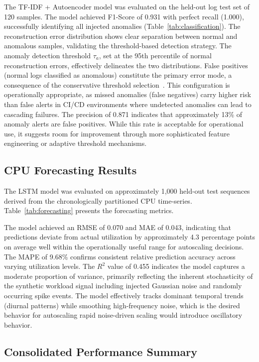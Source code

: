 \documentclass[a4paper,fleqn]{cas-dc}
\begin{document}
The TF-IDF + Autoencoder model was evaluated on the held-out log test set of 120 samples.
The model achieved F1-Score of 0.931 with perfect recall (1.000), successfully identifying all injected anomalies (Table~\ref{tab:classification}).
The reconstruction error distribution shows clear separation between normal and anomalous samples, validating the threshold-based detection strategy.
The anomaly detection threshold $\tau_a$, set at the 95th percentile of normal reconstruction errors, effectively delineates the two distributions.
False positives (normal logs classified as anomalous) constitute the primary error mode, a consequence of the conservative threshold selection~\citep{sakurada2014anomaly}.
This configuration is operationally appropriate, as missed anomalies (false negatives) carry higher risk than false alerts in CI/CD environments where undetected anomalies can lead to cascading failures.
The precision of 0.871 indicates that approximately 13\% of anomaly alerts are false positives.
While this rate is acceptable for operational use, it suggests room for improvement through more sophisticated feature engineering or adaptive threshold mechanisms.

\subsection{CPU Forecasting Results}\label{subsec:cpuresults}

The LSTM model was evaluated on approximately 1,000 held-out test sequences derived from the chronologically partitioned CPU time-series.
Table~\ref{tab:forecasting} presents the forecasting metrics.

The model achieved an RMSE of 0.070 and MAE of 0.043, indicating that predictions deviate from actual utilization by approximately 4.3 percentage points on average well within the operationally useful range for autoscaling decisions.
The MAPE of 9.68\% confirms consistent relative prediction accuracy across varying utilization levels.
The $R^2$ value of 0.455 indicates the model captures a moderate proportion of variance, primarily reflecting the inherent stochasticity of the synthetic workload signal including injected Gaussian noise and randomly occurring spike events.
The model effectively tracks dominant temporal trends (diurnal patterns) while smoothing high-frequency noise, which is the desired behavior for autoscaling rapid noise-driven scaling would introduce oscillatory behavior.

\subsection{Consolidated Performance Summary}\label{subsec:consolidated}
\end{document}
